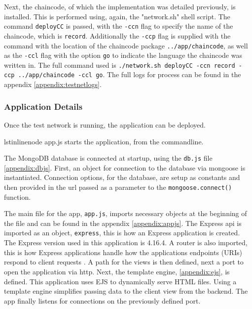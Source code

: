 Next, the chaincode, of which the implementation was detailed previously, is installed. 
This is performed using, again, the "network.sh" shell script. 
The command \lstinline{deployCC} is passed, with the \lstinline{-ccn} flag to specify the name of the chaincode, which is \lstinline{record}. 
Additionally the \lstinline{-ccp} flag is supplied with the command with the location of the chaincode package \lstinline{../app/chaincode}, as well as the \lstinline{-ccl} flag with the option \lstinline{go} to indicate the language the chaincode was written in. 
The full command used is \lstinline{./network.sh deployCC -ccn record -ccp ../app/chaincode -ccl go}. 
The full logs for process can be found in the appendix \ref{appendix:testnetlogs}.

\subsubsection{Application Details}
Once the test network is running, the application can be deployed. 

lstinline{node app.js} starts the application, from the commandline. 

The MongoDB database is connected at startup, using the \lstinline{db.js} file \ref{appendix:dbjs}. 
First, an object for connection to the database via mongoose is instantiated. 
Connection options, for the database, are setup as constants and then provided in the url passed as a parameter to the \lstinline{mongoose.connect()} function. 

The main file for the app, \lstinline{app.js}, imports necessary objects at the beginning of the file and can be found in the appendix \ref{appendix:appjs}. 
The Express api is imported as an object, \lstinline{express}, this is how an Express application is created. \cite{noauthor_express_nodate}
The Express version used in this application is 4.16.4. 
A router is also imported, this is how Express applications handle how the applications endpoints (URIs) respond to client requests \cite{routing_express_nodate}.
A path for the views is then defined, next a port to open the application via http. 
Next, the template engine, \ref{appendix:ejs}, is defined. 
This application uses EJS to dynamically serve HTML files. 
Using a template engine simplifies passing data to the client view from the backend. 
The app finally listens for connections on the previously defined port. 

